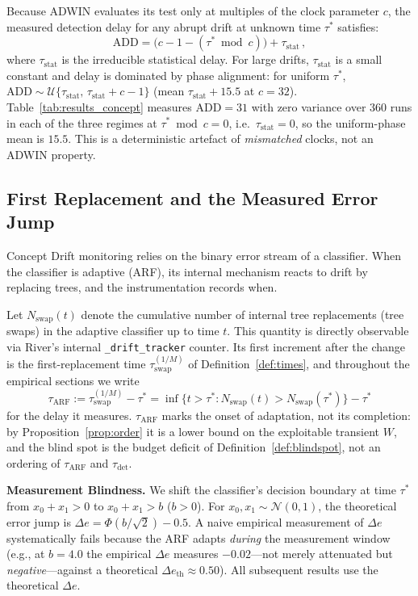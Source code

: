 \documentclass[smallextended]{svjour3}
\begin{document}
Because ADWIN evaluates its test only at multiples of the clock parameter $c$, the measured detection delay for any abrupt drift at unknown time $\tau^*$ satisfies:
\begin{equation}\label{eq:clock}
  \mathrm{ADD} = \bigl(c - 1 - (\tau^* \bmod c)\bigr) + \tau_{\mathrm{stat}}\,,
\end{equation}
where $\tau_{\mathrm{stat}}$ is the irreducible statistical delay. For large drifts, $\tau_{\mathrm{stat}}$ is a small constant and delay is dominated by phase alignment: for uniform $\tau^*$, $\mathrm{ADD} \sim \mathcal{U}\{\tau_{\mathrm{stat}},\, \tau_{\mathrm{stat}} + c - 1\}$ (mean $\tau_{\mathrm{stat}} + 15.5$ at $c{=}32$). Table~\ref{tab:results_concept} measures $\mathrm{ADD} = 31$ with zero variance over $360$ runs in each of the three regimes at $\tau^{*} \bmod c = 0$, i.e.\ $\tau_{\mathrm{stat}} = 0$, so the uniform-phase mean is $15.5$. This is a deterministic artefact of \emph{mismatched} clocks, not an ADWIN property.

\subsection{First Replacement and the Measured Error Jump}\label{sec:race}

Concept Drift monitoring relies on the binary error stream of a classifier.
When the classifier is adaptive (ARF), its internal mechanism reacts to drift by replacing trees, and the instrumentation records when.

Let $N_{\mathrm{swap}}(t)$ denote the cumulative number of internal tree replacements (tree swaps) in the adaptive classifier up to time $t$. This quantity is directly observable via River's internal \texttt{\_drift\_tracker} counter. Its first increment after the change is the first-replacement time $\tau_{\mathrm{swap}}^{(1/M)}$ of Definition~\ref{def:times}, and throughout the empirical sections we write
\[
  \tau_{\mathrm{ARF}} := \tau_{\mathrm{swap}}^{(1/M)} - \tau^* = \inf\bigl\{t > \tau^* : N_{\mathrm{swap}}(t) > N_{\mathrm{swap}}(\tau^*) \bigr\} - \tau^*
\]
for the delay it measures. $\tau_{\mathrm{ARF}}$ marks the onset of adaptation, not its completion: by Proposition~\ref{prop:order} it is a lower bound on the exploitable transient $W$, and the blind spot is the budget deficit of Definition~\ref{def:blindspot}, not an ordering of $\tau_{\mathrm{ARF}}$ and $\tau_{\mathrm{det}}$.

\noindent\textbf{Measurement Blindness.}
We shift the classifier's decision boundary at time $\tau^*$ from $x_0 + x_1 > 0$ to $x_0 + x_1 > b$ ($b > 0$).
For $x_0, x_1 \sim \mathcal{N}(0,1)$, the theoretical error jump is $\Delta e = \Phi(b/\sqrt{2}) - 0.5$. A naive empirical measurement of $\Delta e$ systematically fails because the ARF adapts \emph{during} the measurement window (e.g., at $b = 4.0$ the empirical $\Delta e$ measures $-0.02$---not merely attenuated but \emph{negative}---against a theoretical $\Delta e_{\mathrm{th}} \approx 0.50$). All subsequent results use the theoretical $\Delta e$.
\end{document}
